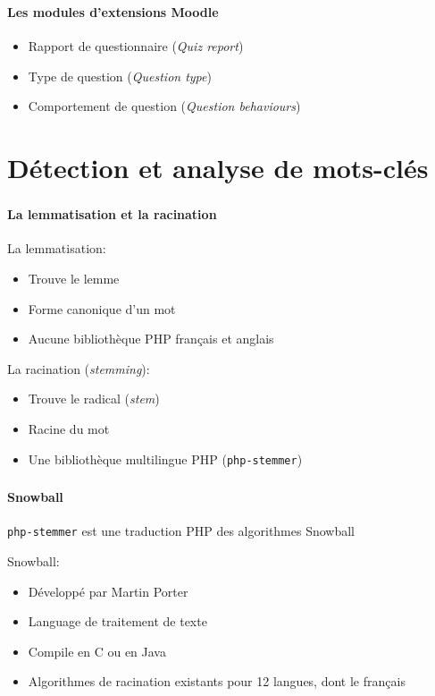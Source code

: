 \documentclass{beamer}
\begin{document}
  \begin{frame}
  \frametitle{\insertsection}
  \framesubtitle{Les modules d'extensions Moodle}
  \begin{itemize}
    \item Rapport de questionnaire (\textit{Quiz report})
    \item Type de question (\textit{Question type})
    \item Comportement de question (\textit{Question behaviours})
  \end{itemize}
  \end{frame}
  
  \section[Mots-cl\'es]{D\'etection et analyse de mots-cl\'es}
  \begin{frame}
  \frametitle{\insertsection}
  \framesubtitle{La lemmatisation et la racination}
  La lemmatisation:
  \begin{itemize}
    \item Trouve le lemme
    \item Forme canonique d'un mot
    \item Aucune biblioth\`eque PHP fran\c{c}ais et anglais
  \end{itemize}
  
  \medskip
  
  La racination (\textit{stemming}):
  \begin{itemize}
    \item Trouve le radical (\textit{stem})
    \item Racine du mot
    \item Une biblioth\`eque multilingue PHP (\texttt{php-stemmer})
  \end{itemize}
  \end{frame}
  
  \begin{frame}
  \frametitle{\insertsection}
  \framesubtitle{Snowball}
  \texttt{php-stemmer} est une traduction PHP des algorithmes Snowball
  
  \bigskip
  
  Snowball:
  \begin{itemize}
    \item D\'evelopp\'e par Martin Porter
    \item Language de traitement de texte
    \item Compile en C ou en Java
    \item Algorithmes de racination existants pour 12 langues, dont le fran\c{c}ais
  \end{itemize}
  \end{frame}
  
\end{document}
